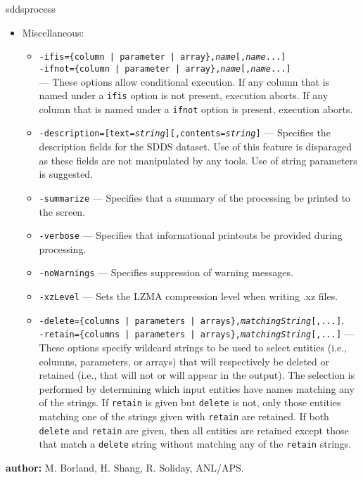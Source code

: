 \begin{sddsprog}{sddsprocess}
\begin{itemize}
\begin{itemize}
\end{itemize}


    \item Miscellaneous:
        \begin{itemize}
        \item {\tt -ifis=\{column | parameter | array\},{\em name}[,{\em name}...]}\\ {\tt -ifnot=\{column | parameter |
array\},{\em name}[,{\em name}...]} \\ --- These options allow conditional execution.  If any column that is named under a
\verb|ifis| option is not present, execution aborts.  If any column that is named under a \verb|ifnot| option is
present, execution aborts.
        \item {\tt -description=[text={\em string}][,contents={\em string}]} --- Specifies the
        description fields for the SDDS dataset.  Use of this feature is disparaged as these fields
        are not manipulated by any tools.  Use of string parameters is suggested.
        \item {\tt -summarize} --- Specifies that a summary of the processing be printed to the screen.
        \item {\tt -verbose} --- Specifies that informational printouts be provided during processing.
        \item {\tt -noWarnings} --- Specifies suppression of warning messages.
        \item {\tt -xzLevel} --- Sets the LZMA compression level when writing .xz files.
        \item {\tt -delete=\{columns | parameters | arrays\},{\em matchingString}[,...]},\\
        {\tt -retain=\{columns | parameters | arrays\},{\em matchingString}[,...]}
         --- These options specify wildcard strings to be used to select entities
        (i.e., columns, parameters, or arrays) that will respectively be deleted or retained (i.e., that will not or
        will appear in the output).   
        The selection is performed by determining which input entities have names matching any of the strings.
        If \verb|retain| is given but \verb|delete| is not, only those entities matching one of the
        strings given with \verb|retain| are retained.  If both \verb|delete| and \verb|retain|
        are given, then all entities are retained except those that match a \verb|delete| string without
        matching any of the \verb|retain| strings.
        \end{itemize}
    \end{itemize}

  \item \textbf{author:} M. Borland, H. Shang, R. Soliday, ANL/APS.
\end{sddsprog}

